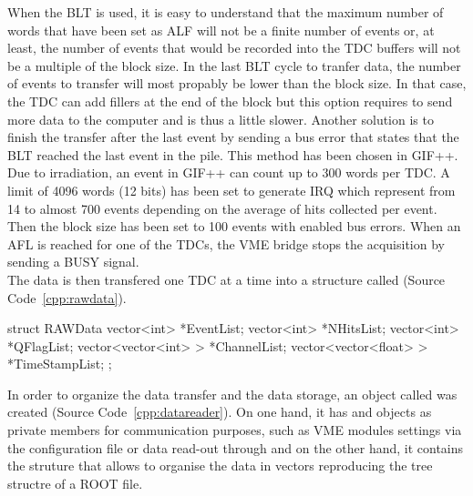 	When the BLT is used, it is easy to understand that the maximum number of words that have been set as ALF will not be a finite number of events or, at least, the number of events that would be recorded into the TDC buffers will not be a multiple of the block size. In the last BLT cycle to tranfer data, the number of events to transfer will most propably be lower than the block size. In that case, the TDC can add fillers at the end of the block but this option requires to send more data to the computer and is thus a little slower. Another solution is to finish the transfer after the last event by sending a bus error that states that the BLT reached the last event in the pile. This method has been chosen in GIF++.\\
	
	Due to irradiation, an event in GIF++ can count up to 300 words per TDC. A limit of 4096 words (12 bits) has been set to generate IRQ which represent from 14 to almost 700 events depending on the average of hits collected per event. Then the block size has been set to 100 events with enabled bus errors. When an AFL is reached for one of the TDCs, the VME bridge stops the acquisition by sending a BUSY signal.\\
	
	The data is then transfered one TDC at a time into a structure called  (Source Code~\ref{cpp:rawdata}).\\
	
	\begin{code}
    \begin{cppcode}
struct RAWData{
    vector<int>            *EventList;
    vector<int>            *NHitsList;
    vector<int>            *QFlagList;
    vector<vector<int> >   *ChannelList;
    vector<vector<float> > *TimeStampList;
};
    \end{cppcode}
	\label{cpp:rawdata}
	\vspace{5mm}
    \end{code}

	In order to organize the data transfer and the data storage, an object called  was created (Source Code~\ref{cpp:datareader}). On one hand, it has  and  objects as private members for communication purposes, such as VME modules settings via the configuration file  or data read-out through  and on the other hand, it contains the struture  that allows to organise the data in vectors reproducing the tree structre of a ROOT file.\\
	
